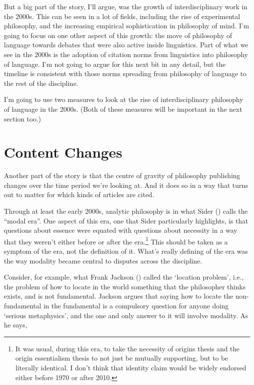 \documentclass[
  12pt,
  letterpaper,
  DIV=11,
  numbers=noendperiod]{scrartcl}
\begin{document}
But a big part of the story, I'll argue, was the growth of
interdisciplinary work in the 2000s. This can be seen in a lot of
fields, including the rise of experimental philosophy, and the
increasing empirical sophistication in philosophy of mind. I'm going to
focus on one other aspect of this growth: the move of philosophy of
language towards debates that were also active inside linguistics. Part
of what we see in the 2000s is the adoption of citation norms from
linguistics into philosophy of language. I'm not going to argue for this
next bit in any detail, but the timeline is consistent with those norms
spreading from philosophy of language to the rest of the discipline.

I'm going to use two measures to look at the rise of interdisciplinary
philosophy of language in the 2000s. (Both of these measures will be
important in the next section too.)

\section{Content Changes}\label{sec-content}

Another part of the story is that the centre of gravity of philosophy
publishing changes over the time period we're looking at. And it does so
in a way that turns out to matter for which kinds of articles are cited.

Through at least the early 2000s, analytic philosophy is in what Sider
() calls the ``modal era''. One aspect
of this era, one that Sider particularly highlights, is that questions
about essence were equated with questions about necessity in a way that
they weren't either before or after the era.\footnote{It was usual,
  during this era, to take the necessity of origins thesis and the
  origin essentialism thesis to not just be mutually supporting, but to
  be literally identical. I don't think that identity claim would be
  widely endorsed either before 1970 or after 2010.} This should be
taken as a symptom of the era, not the definition of it. What's really
defining of the era was the way modality became central to disputes
across the discipline.

Consider, for example, what Frank Jackson
() called the `location problem', i.e.,
the problem of how to locate in the world something that the philosopher
thinks exists, and is not fundamental. Jackson argues that saying how to
locate the non-fundamental in the fundamental is a compulsory question
for anyone doing `serious metaphysics', and the one and only answer to
it will involve modality. As he says,
\end{document}
